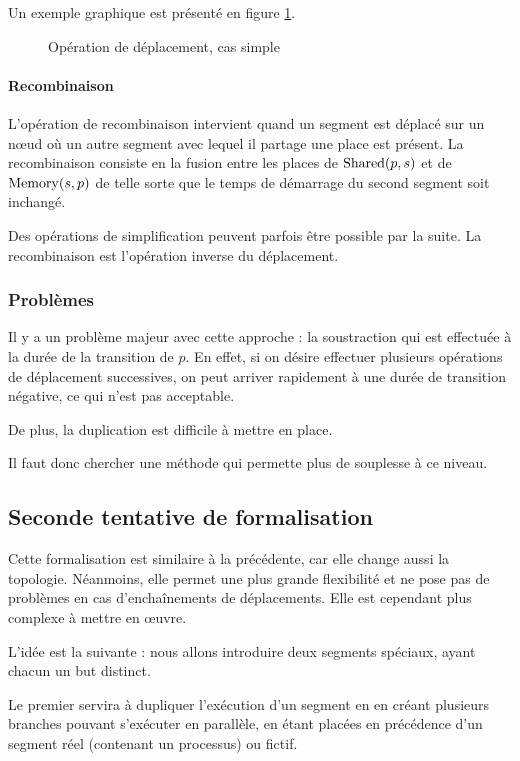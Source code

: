 Un exemple graphique est présenté en figure \ref{fig:deplacementMethode1}.

\begin{figure}[h!]
\centering

\caption{Opération de déplacement, cas simple}
\label{fig:deplacementMethode1}
\end{figure}

\paragraph{Recombinaison}
L'opération de recombinaison intervient quand un segment est déplacé sur un nœud où un autre segment avec lequel il partage une place est présent.
La recombinaison consiste en la fusion entre les places de $\operatorname{Shared}(p, s)$ et de  $\operatorname{Memory}(s, p)$ de telle sorte que le temps de démarrage du second segment soit inchangé.

Des opérations de simplification peuvent parfois être possible par la suite.
La recombinaison est l'opération inverse du déplacement.

\subsubsection{Problèmes}
Il y a un problème majeur avec cette approche : la soustraction qui est effectuée à la durée de la transition de $p$. En effet, si on désire effectuer plusieurs opérations de déplacement successives, on peut arriver rapidement à une durée de transition négative, ce qui n'est pas acceptable.

De plus, la duplication est difficile à mettre en place.

Il faut donc chercher une méthode qui permette plus de souplesse à ce niveau.

\subsection{Seconde tentative de formalisation}
Cette formalisation est similaire à la précédente, car elle change aussi la topologie. Néanmoins, elle permet une plus grande flexibilité et ne pose pas de problèmes en cas d'enchaînements de déplacements.
Elle est cependant plus complexe à mettre en œuvre.

L'idée est la suivante : nous allons introduire deux segments spéciaux, ayant chacun un but distinct.

Le premier servira à dupliquer l'exécution d'un segment en en créant plusieurs branches pouvant s'exécuter en parallèle, en étant placées en précédence d'un segment réel (contenant un processus) ou fictif.

